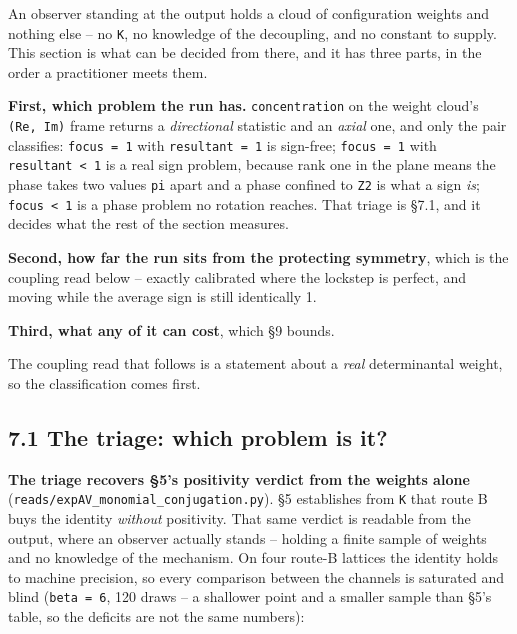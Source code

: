 \documentclass[10pt,letterpaper,twocolumn]{article}
\begin{document}
An observer standing at the output holds a cloud of configuration weights and nothing else -- no
\texttt{K}, no knowledge of the decoupling, and no constant to supply. This section is what can be
decided from there, and it has three parts, in the order a practitioner meets them.

\textbf{First, which problem the run has.} \texttt{concentration} on the weight cloud's \texttt{(\allowbreak{}Re,\allowbreak{}\ Im)\allowbreak{}} frame
returns a \emph{directional} statistic and an \emph{axial} one, and only the pair classifies: \texttt{focus\ =\allowbreak{}\ 1}
with \texttt{resultant\ =\allowbreak{}\ 1} is sign-free; \texttt{focus\ =\allowbreak{}\ 1} with \texttt{resultant\ \textless{}\allowbreak{}\ 1} is a real sign problem, because
rank one in the plane means the phase takes two values \texttt{pi} apart and a phase confined to \texttt{Z2} is
what a sign \emph{is}; \texttt{focus\ \textless{}\allowbreak{}\ 1} is a phase problem no rotation reaches. That triage is §7.1, and it
decides what the rest of the section measures.

\textbf{Second, how far the run sits from the protecting symmetry}, which is the coupling read below --
exactly calibrated where the lockstep is perfect, and moving while the average sign is still
identically 1.

\textbf{Third, what any of it can cost}, which §9 bounds.

The coupling read that follows is a statement about a \emph{real} determinantal weight, so the
classification comes first.

\subsection{7.1 The triage: which problem is it?}\label{71-the-triage-which-problem-is-it}

\textbf{The triage recovers §5's positivity verdict from the weights alone}
(\texttt{reads/\allowbreak{}expAV\_\allowbreak{}monomial\_\allowbreak{}conjugation.\allowbreak{}py}). §5 establishes from \texttt{K} that route B buys the identity
\emph{without} positivity. That same verdict is readable from the output, where an observer actually
stands -- holding a finite sample of weights and no knowledge of the mechanism. On four route-B
lattices the identity holds to machine precision, so every comparison between the channels is
saturated and blind (\texttt{beta\ =\allowbreak{}\ 6}, 120 draws -- a shallower point and a smaller sample than §5's
table, so the deficits are not the same numbers):
\end{document}
